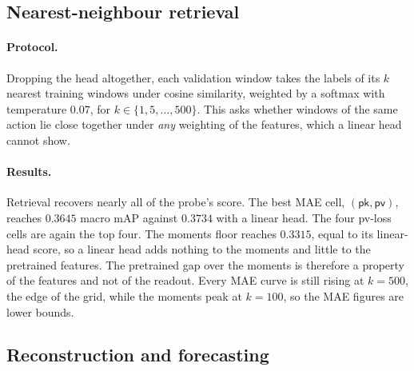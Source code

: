 
\subsection{Nearest-neighbour retrieval}
\label{sec:exp-knn}

\paragraph{Protocol.} Dropping the head altogether, each validation window takes the labels
of its $k$ nearest training windows under cosine similarity, weighted by a softmax with
temperature $0.07$, for $k\in\{1,5,\dots,500\}$. This asks whether windows of the same
action lie close together under \emph{any} weighting of the features, which a linear head
cannot show.

\paragraph{Results.} Retrieval recovers nearly all of the probe's score. The best MAE cell,
$(\textsf{pk},\textsf{pv})$, reaches $0.3645$ macro mAP against $0.3734$ with a linear head.
The four \textsf{pv}-loss cells are again the top four. The moments floor reaches $0.3315$,
equal to its linear-head score, so a linear head adds nothing to the moments and little to
the pretrained features. The pretrained gap over the moments is therefore a property of the
features and not of the readout. Every MAE curve is still rising at $k=500$, the edge of
the grid, while the moments peak at $k=100$, so the MAE figures are lower bounds.

\subsection{Reconstruction and forecasting}
\label{sec:exp-reconstruction}

